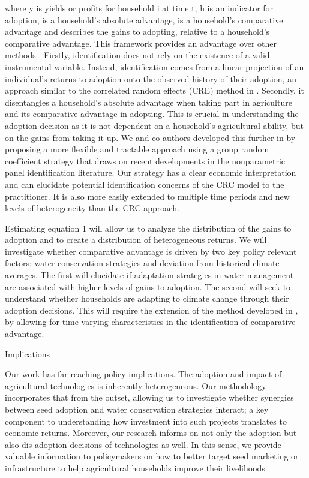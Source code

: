 \documentclass{article}
\begin{document}
where y is yields or profits for household i at time t, h is an indicator for adoption,  is a household’s absolute advantage,  is a household’s comparative advantage and  describes the gains to adopting, relative to a household’s comparative advantage. This framework provides an advantage over other methods \citep{Wooldridge1997-xj,Heckman1998-pt}. Firstly, identification does not rely on the existence of a valid instrumental variable. Instead, identification comes from a linear projection of an individual's returns to adoption onto the observed history of their adoption, an approach similar to the correlated random effects (CRE) method in \citep{Chamberlain1984-uk}. Secondly, it disentangles a household’s absolute advantage when taking part in agriculture and its comparative advantage in adopting. This is crucial in understanding the adoption decision as it is not dependent on a household’s agricultural ability, but on the gains from taking it up. We and co-authors developed this further in \citep{Tjernstrom_Emilia_Dalia_Ghanem_Oscar_Barriga_Cabanillas_Travis_J_Lybbert_Jeffrey_D_Michler_and_Aleksandr_Michuda2020-bc} by proposing a more flexible and tractable approach using a group random coefficient strategy that draws on recent developments in the nonparametric panel identification literature. Our strategy has a clear economic interpretation and can elucidate potential identification concerns of the CRC model to the practitioner. It is also more easily extended to multiple time periods and new levels of heterogeneity than the CRC approach.

Estimating equation 1 will allow us  to analyze the distribution of the gains to adoption and to create a distribution of heterogeneous returns. We will investigate whether comparative advantage is driven by two key policy relevant factors: water conservation strategies and deviation from historical climate averages. The first will elucidate if adaptation strategies in water management are associated with higher levels of gains to adoption. The second will seek to understand whether households are adapting to climate change through their adoption decisions. This will require the extension of the method developed in \citep{Tjernstrom_Emilia_Dalia_Ghanem_Oscar_Barriga_Cabanillas_Travis_J_Lybbert_Jeffrey_D_Michler_and_Aleksandr_Michuda2020-bc}, by allowing for time-varying characteristics in the identification of comparative advantage.

Implications 

Our work has far-reaching policy implications. The adoption and impact of agricultural technologies is inherently heterogeneous. Our methodology incorporates that from the outset, allowing us to investigate whether synergies between seed adoption and water conservation strategies interact; a key component to understanding how investment into such projects translates to economic returns. Moreover, our research informs on not only the adoption but also dis-adoption decisions of technologies as well. In this sense, we provide valuable information to policymakers on how to better target seed marketing or infrastructure to help agricultural households improve their livelihoods
\end{document}
